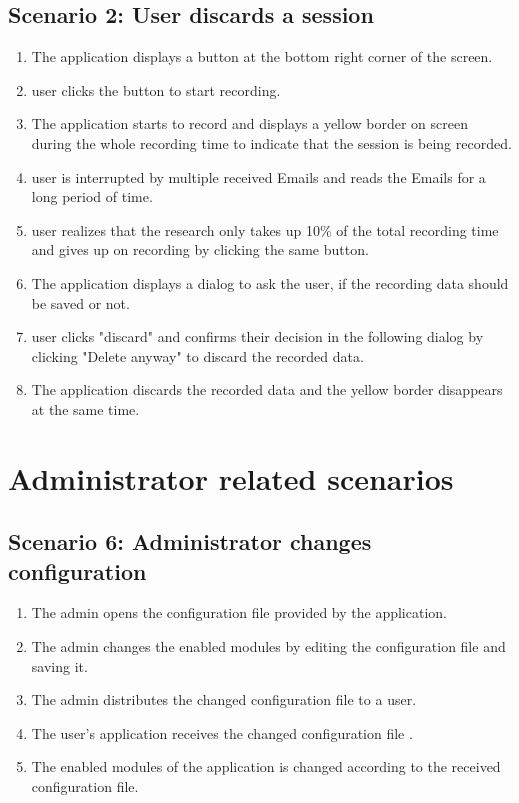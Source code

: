 \subsection{Scenario 2: User discards a session}
\begin{enumerate}
    \item The application displays a button at the bottom right corner of the screen.
    \item \Gls{user} clicks the button to start recording.
    \item The application starts to record and displays a yellow border on screen during the whole recording time to indicate that the \gls{session} is being recorded.
    \item \Gls{user} is interrupted by multiple received Emails and reads the Emails for a long period of time.
    \item \Gls{user} realizes that the research only takes up 10\% of the total recording time and gives up on recording by clicking the same button.
    \item The application displays a dialog to ask the \gls{user}, if the recording data should be saved or not.
    \item \Gls{user} clicks "discard" and confirms their decision in the following dialog by clicking "Delete anyway" to discard the recorded data.
    \item The application discards the recorded data and the yellow border disappears at the same time.
\end{enumerate}

\setcounter{subsection}{3} %
\setcounter{subsection}{4} %

\setcounter{section}{2} %

\section{Administrator related scenarios}
\subsection{Scenario 6: Administrator changes configuration}
\begin{enumerate}
    \item The \gls{admin} opens the configuration file provided by the application.
    \item The \gls{admin} changes the enabled modules by editing the configuration file and saving it.
    \item The \gls{admin} distributes the changed configuration file to a \gls{user}.
    \item The \gls{user}'s application receives the changed configuration file .
    \item The enabled modules of the application is changed according to the received configuration file.
\end{enumerate}


